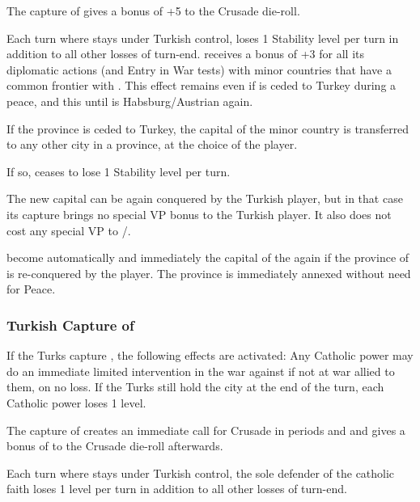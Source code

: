 The capture of  gives a bonus of +5 to the Crusade die-roll.

Each turn where  stays under Turkish control, \HAB loses 1
Stability level per turn in addition to all other losses of turn-end.
\bparag \MAJHAB receives a bonus of +3 for all its diplomatic actions (and
Entry in War tests) with minor countries that have a common frontier with
\AUSaus. This effect remains even if  is ceded to Turkey during
a peace, and this until  is Habsburg/Austrian again.

If the province  is ceded to Turkey, the capital of the
 minor country is transferred to any other city in a
 province, at the choice of the \HAB player.

\bparag If so, \HAB ceases to lose 1 Stability level per turn.

\bparag The new capital can be again conquered by the Turkish player, but in
that case its capture brings no special VP bonus to the Turkish player. It
also does not cost any special VP to \HAB/\AUS.

\bparag {} become automatically and immediately the capital of the
 again if the province of  is
re-conquered by the \HAB player. The province is immediately annexed without
need for Peace.


\subsubsection{Turkish Capture of \villeRoma}\label{chSpecific:Fall Roma}
\aparag If the Turks capture , the following effects are
activated:
\bparag Any Catholic power may do an immediate limited intervention in the war
against \TUR if not at war allied to them, on no \STAB loss.
\bparag If the Turks still hold the city at the end of the turn, each Catholic
power loses 1 \STAB level.

 The capture of \villeRoma creates an
immediate call for Crusade in periods  and  and gives a
bonus of  to the Crusade die-roll afterwards.

Each turn where \villeRoma stays under Turkish control, the sole defender of
the catholic faith loses 1 \STAB level per turn in addition to all other
losses of turn-end.

